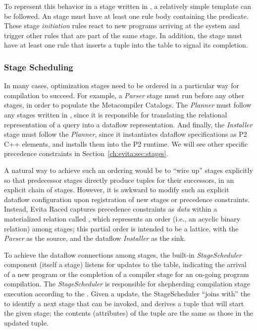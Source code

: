To represent this behavior in a stage written in \OVERLOG, a relatively simple
template can be followed.  An \OVERLOG stage must have at least one rule body
containing the  predicate.  These stage {\em
initiation} rules react to new programs arriving at the system and trigger
other rules that are part of the same stage.  In addition, the stage must have
at least one rule that inserts a  tuple into the  table
to signal its completion. 

\subsubsection{Stage Scheduling}
\label{ch:evita:sec:stageschedule}

In many cases, optimization stages need to be ordered in a particular way for
compilation to succeed.  For example, a {\em Parser} stage must run before any
other stages, in order to populate the Metacompiler Catalogs.  The {\em
Planner} must follow any stages written in \OVERLOG, since it is responsible
for translating the relational representation of a query into a dataflow
representation.  And finally, the {\em Installer} stage must follow the {\em
Planner}, since it instantiates dataflow specifications as P2 C++ elements, and
installs them into the P2 runtime.  We will see other specific precedence
constraints in Section~\ref{ch:evita:sec:stages}.

A natural way to achieve such an ordering would be to ``wire up'' stages
explicitly so that predecessor stages directly produce
 tuples for their successors, in an explicit chain of
stages.  However, it is awkward to modify such an explicit dataflow
configuration upon registration of new stages or precedence constraints.
Instead, Evita Raced captures precedence constraints as {\em data} within a
materialized relation called , which represents an
order (i.e., an acyclic binary relation) among stages; this partial
order is intended to be a lattice, with the {\em Parser} as the source, and the
dataflow {\em Installer} as the sink.  
 
To achieve the dataflow connections among stages, the built-in {\em
StageScheduler} component (itself a stage) listens for updates to the
 table, indicating the arrival of a new \OVERLOG program or the
completion of a compiler stage for an on-going program compilation.  The {\em
StageScheduler} is responsible for shepherding compilation stage execution
according to the .  Given a  update, the
StageScheduler ``joins with'' the  to identify a next stage
that can be invoked, and derives a  tuple that will
start the given stage; the contents (attributes) of the
 tuple are the same as those in the updated
 tuple.

